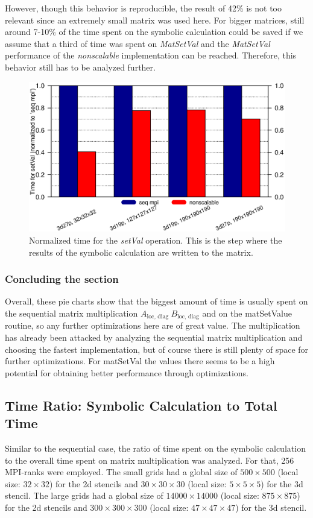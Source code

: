 However, though this behavior is reproducible, the result of 42\% is not too relevant since an extremely small matrix was used here. For bigger matrices, still around 7-10\% of the time spent on the symbolic calculation could be saved if we assume that a third of time was spent on \textit{MatSetVal} and the \textit{MatSetVal} performance of the \textit{nonscalable} implementation can be reached.  Therefore, this behavior still has to be analyzed further.


\begin{figure}[tbp]
	\centering
	\includegraphics[width=1\textwidth, trim={0 2cm 0 7cm},clip]{setvalues}
	\caption{Normalized time for the \textit{setVal} operation. This is the step where the results of the symbolic calculation are written to the matrix.} 
	\label{fig:setvalues}
\end{figure}

\subsubsection*{Concluding the section}
Overall, these pie charts show that the biggest amount of time is usually spent on the sequential matrix multiplication $A_{\textrm{loc, diag~}} B_{\textrm{loc, diag}}$ and on the matSetValue routine, so any further optimizations here are of great value. The multiplication has already been attacked by analyzing the sequential matrix multiplication and choosing the fastest implementation, but of course there is still plenty of space for further optimizations. For matSetVal the values there seems to be a high potential for obtaining better performance through optimizations.


\subsection{Time Ratio: Symbolic Calculation to Total Time}
Similar to the sequential case, the ratio of time spent on the symbolic calculation to the overall time spent on matrix multiplication was analyzed. For that, 256 MPI-ranks were employed. The small grids had a global size of $500\times 500$ (local size: $32\times 32$) for the 2d stencils and $30\times 30 \times 30$ (local size: $5\times 5 \times 5$) for the 3d stencil. The large grids had a global size of $14000\times 14000$ (local size: $875 \times 875$) for the 2d stencils and $300 \times 300 \times 300$ (local size: $47\times 47 \times 47$) for the 3d stencil. 

